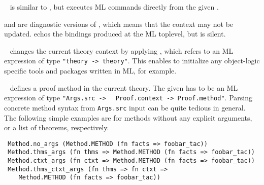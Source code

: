 \begin{isabellebody}
\begin{isamarkuptext}
\begin{descr}
  \item [\hyperlink{command.ML}{\mbox{\isa{\isacommand{ML}}}}~\isa{{\isachardoublequote}text{\isachardoublequote}}] is similar to \hyperlink{command.use}{\mbox{}}, but executes ML commands directly from the given .

  \item [\hyperlink{command.ML-val}{\mbox{\isa{\isacommand{ML{\isacharunderscore}val}}}} and \hyperlink{command.ML-command}{\mbox{\isa{\isacommand{ML{\isacharunderscore}command}}}}] are
  diagnostic versions of \hyperlink{command.ML}{\mbox{}}, which means that the context
  may not be updated.  \hyperlink{command.ML-val}{\mbox{}} echos the bindings produced
  at the ML toplevel, but \hyperlink{command.ML-command}{\mbox{}} is silent.
  
  \item [\hyperlink{command.setup}{\mbox{\isa{\isacommand{setup}}}}~\isa{{\isachardoublequote}text{\isachardoublequote}}] changes the current theory
  context by applying , which refers to an ML expression
  of type \verb|"theory -> theory"|.  This enables to initialize
  any object-logic specific tools and packages written in ML, for
  example.
  
  \item [\hyperlink{command.method-setup}{\mbox{\isa{\isacommand{method{\isacharunderscore}setup}}}}~\isa{{\isachardoublequote}name\ {\isacharequal}\ text\ description{\isachardoublequote}}]
  defines a proof method in the current theory.  The given  has to be an ML expression of type \verb|"Args.src ->|\isasep\isanewline%
\verb|  Proof.context -> Proof.method"|.  Parsing concrete method syntax
  from \verb|Args.src| input can be quite tedious in general.  The
  following simple examples are for methods without any explicit
  arguments, or a list of theorems, respectively.

{\footnotesize
\begin{verbatim}
 Method.no_args (Method.METHOD (fn facts => foobar_tac))
 Method.thms_args (fn thms => Method.METHOD (fn facts => foobar_tac))
 Method.ctxt_args (fn ctxt => Method.METHOD (fn facts => foobar_tac))
 Method.thms_ctxt_args (fn thms => fn ctxt =>
    Method.METHOD (fn facts => foobar_tac))
\end{verbatim}
}


\end{descr}
\end{isamarkuptext}
\end{isabellebody}

